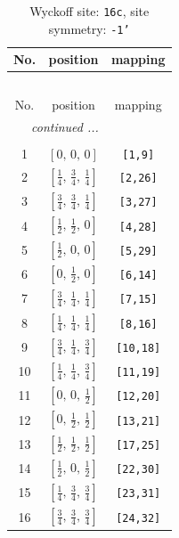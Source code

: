 \documentclass[fleqn,8pt]{jsarticle}
\begin{document}
\begin{longtable}{ccc}
\caption{Wyckoff site: {\tt 16c}, site symmetry: {\tt -1'}}
 \\
 \hline \hline
No. & position & mapping \\ \hline \endfirsthead

\multicolumn{2}{l}{\tablename\ \thetable{}} \\
 \hline \hline
No. & position & mapping \\ \hline \endhead

 \hline \hline
\multicolumn{2}{r}{\footnotesize\it continued ...} \\ \endfoot

 \hline \hline
\multicolumn{2}{r}{} \\ \endlastfoot

1 & $\left[ 0,\, 0,\, 0 \right]$ & {\tt [1,9]} \\ \hline
2 & $\left[ \frac{1}{4},\, \frac{3}{4},\, \frac{1}{4} \right]$ & {\tt [2,26]} \\ \hline
3 & $\left[ \frac{3}{4},\, \frac{3}{4},\, \frac{1}{4} \right]$ & {\tt [3,27]} \\ \hline
4 & $\left[ \frac{1}{2},\, \frac{1}{2},\, 0 \right]$ & {\tt [4,28]} \\ \hline
5 & $\left[ \frac{1}{2},\, 0,\, 0 \right]$ & {\tt [5,29]} \\ \hline
6 & $\left[ 0,\, \frac{1}{2},\, 0 \right]$ & {\tt [6,14]} \\ \hline
7 & $\left[ \frac{3}{4},\, \frac{1}{4},\, \frac{1}{4} \right]$ & {\tt [7,15]} \\ \hline
8 & $\left[ \frac{1}{4},\, \frac{1}{4},\, \frac{1}{4} \right]$ & {\tt [8,16]} \\ \hline
9 & $\left[ \frac{3}{4},\, \frac{1}{4},\, \frac{3}{4} \right]$ & {\tt [10,18]} \\ \hline
10 & $\left[ \frac{1}{4},\, \frac{1}{4},\, \frac{3}{4} \right]$ & {\tt [11,19]} \\ \hline
11 & $\left[ 0,\, 0,\, \frac{1}{2} \right]$ & {\tt [12,20]} \\ \hline
12 & $\left[ 0,\, \frac{1}{2},\, \frac{1}{2} \right]$ & {\tt [13,21]} \\ \hline
13 & $\left[ \frac{1}{2},\, \frac{1}{2},\, \frac{1}{2} \right]$ & {\tt [17,25]} \\ \hline
14 & $\left[ \frac{1}{2},\, 0,\, \frac{1}{2} \right]$ & {\tt [22,30]} \\ \hline
15 & $\left[ \frac{1}{4},\, \frac{3}{4},\, \frac{3}{4} \right]$ & {\tt [23,31]} \\ \hline
16 & $\left[ \frac{3}{4},\, \frac{3}{4},\, \frac{3}{4} \right]$ & {\tt [24,32]} \\
\end{longtable}
\end{document}
